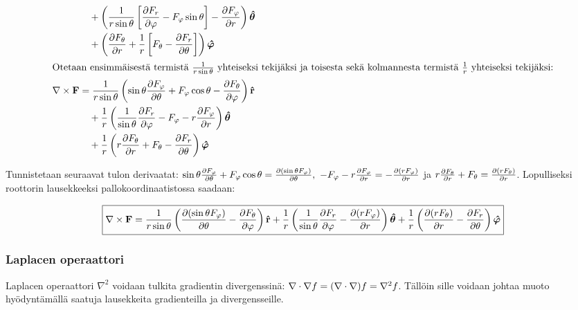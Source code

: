 \documentclass[../johdoksia.tex]{subfiles}
\begin{document}
\begin{enumerate}
\begin{align}
			&\quad + \left(\frac{1}{r\sin\theta}\left[\pdv{F_r}{\varphi} - F_\varphi\sin\theta\right] - \pdv{F_\varphi}{r}\right)\boldsymbol{\hat{\theta}} \\
			&\quad + \left(\pdv{F_\theta}{r} + \frac{1}{r}\left[F_\theta - \pdv{F_r}{\theta}\right]\right)\boldsymbol{\hat{\varphi}} \\
			\intertext{Otetaan ensimmäisestä termistä $\frac{1}{r\sin\theta}$ yhteiseksi tekijäksi ja toisesta sekä kolmannesta termistä $\frac{1}{r}$ yhteiseksi tekijäksi:}
			\nabla\times\mathbf{F} &= \frac{1}{r\sin\theta}\left(\sin\theta\pdv{F_\varphi}{\theta} + F_\varphi\cos\theta - \pdv{F_\theta}{\varphi}\right)\mathbf{\hat{r}} \\
			&\quad + \frac{1}{r}\left(\frac{1}{\sin\theta}\pdv{F_r}{\varphi} - F_\varphi - r\pdv{F_\varphi}{r}\right)\boldsymbol{\hat{\theta}} \\
			&\quad + \frac{1}{r}\left(r\pdv{F_\theta}{r} + F_\theta - \pdv{F_r}{\theta}\right)\boldsymbol{\hat{\varphi}}
		\end{align}
		
		\noindent Tunnistetaan seuraavat tulon derivaatat: $\sin\theta\pdv{F_\varphi}{\theta} + F_\varphi\cos\theta = \pdv{(\sin\theta F_\varphi)}{\theta}, \ -F_\varphi - r\pdv{F_\varphi}{r} = -\pdv{(rF_\varphi)}{r}$ ja $r\pdv{F_\theta}{r} + F_\theta = \pdv{(rF_\theta)}{r}$. Lopulliseksi roottorin lausekkeeksi pallokoordinaatistossa saadaan:
		
		\begin{equation}
			\boxed{\nabla\times\mathbf{F} = \frac{1}{r\sin\theta}\left(\pdv{(\sin\theta F_\varphi)}{\theta} - \pdv{F_\theta}{\varphi}\right)\mathbf{\hat{r}}
				+ \frac{1}{r}\left(\frac{1}{\sin\theta}\pdv{F_r}{\varphi} - \pdv{(rF_\varphi)}{r}\right)\boldsymbol{\hat{\theta}}
				+ \frac{1}{r}\left(\pdv{(rF_\theta)}{r} - \pdv{F_r}{\theta}\right)\boldsymbol{\hat{\varphi}}}
		\end{equation}
		
	\end{enumerate}
	
	\subsubsection{Laplacen operaattori}
	
	Laplacen operaattori $\nabla^2$ voidaan tulkita gradientin divergenssinä: $\nabla\cdot\nabla f = (\nabla\cdot\nabla)f = \nabla^2f$. Tällöin sille voidaan johtaa muoto hyödyntämällä saatuja lausekkeita gradienteilla ja divergensseille.
	
\end{document}
